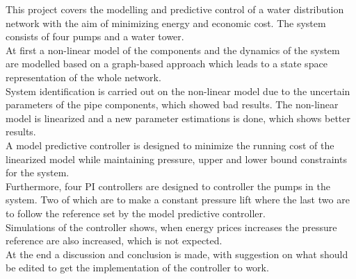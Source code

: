 


This project covers the modelling and predictive control of a water distribution network with the aim of minimizing energy and economic cost. The system consists of four pumps and a water tower.\\
At first a non-linear model of the components and the dynamics of the system are modelled based on a graph-based approach which leads to a state space representation of the whole network.\\ 
System identification is carried out on the non-linear model due to the uncertain parameters of the pipe components, which showed bad results. The non-linear model is linearized and a new parameter estimations is done, which shows better results.\\
A model predictive controller is designed to minimize the running cost of the linearized model while maintaining pressure, upper and lower bound constraints for the system.\\
Furthermore, four PI controllers are designed to controller the pumps in the system. Two of which are to make a constant pressure lift where the last two are to follow the reference set by the model predictive controller. \\
Simulations of the controller shows, when energy prices increases the pressure reference are also increased, which is not expected.\\
At the end a discussion and conclusion is made, with suggestion on what should be edited to get the implementation of the controller to work.  





